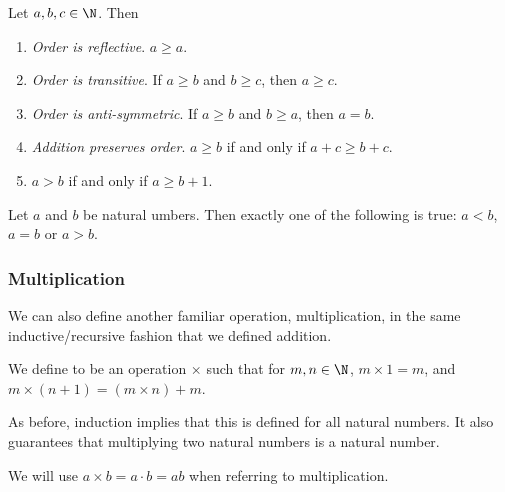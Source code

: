 \documentclass[a4paper]{scrartcl}
\begin{document}
\begin{proposition}
	Let $a, b, c \in \N$. Then
	\begin{enumerate}[label=(\roman*)]
		\item \emph{Order is reflective}. $a \geq a$.
		\item \emph{Order is transitive}. If $a \geq b$ and $b \geq c$, then $a \geq c$.
		\item \emph{Order is anti-symmetric}. If $a \geq b$ and $b \geq a$, then $a = b$.
		\item \emph{Addition preserves order}. $a \geq b$ if and only if $a + c \geq b + c$.
		\item $a > b$ if and only if $a \geq b + 1$.
	\end{enumerate}
\end{proposition}

\begin{proposition}[Trichotomy]
	Let $a$ and $b$ be natural umbers. Then exactly one of the following is true: $a < b$, $a = b$ or $a > b$.
\end{proposition}

\subsubsection{Multiplication}

We can also define another familiar operation, multiplication, in the same inductive/recursive fashion that we defined addition.

\begin{definition}[Multiplication]
	We define  to be an operation $\times$ such that for $m, n \in \N$, $m \times 1 = m$, and $m \times (n + 1) = (m \times n) + m$.
\end{definition}
As before, induction implies that this is defined for all natural numbers. It also guarantees that multiplying two natural numbers is a natural number.

\begin{notation}
We will use $a \times b = a\cdot b = ab$ when referring to multiplication.
\end{notation}
\end{document}
